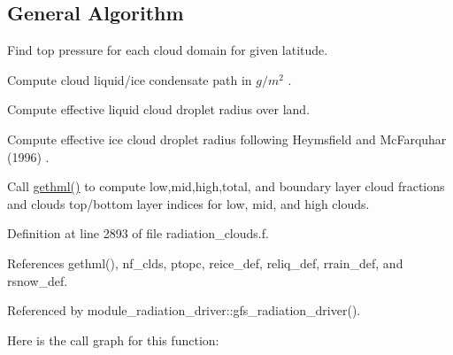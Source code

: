 \hypertarget{group__module__radiation__clouds_gen_progclduni}{}\subsection{General Algorithm}\label{group__module__radiation__clouds_gen_progclduni}

\begin{DoxyEnumerate}
\item Find top pressure for each cloud domain for given latitude.
\item Compute cloud liquid/ice condensate path in $ g/m^2 $ .
\item Compute effective liquid cloud droplet radius over land.
\item Compute effective ice cloud droplet radius following Heymsfield and Mc\+Farquhar (1996) \cite{heymsfield_and_mcfarquhar_1996}.
\item Call \hyperlink{group__module__radiation__clouds_gac231d967afcfb252dedba82e9085b34d}{gethml()} to compute low,mid,high,total, and boundary layer cloud fractions and clouds top/bottom layer indices for low, mid, and high clouds. 
\end{DoxyEnumerate}

Definition at line 2893 of file radiation\+\_\+clouds.\+f.



References gethml(), nf\+\_\+clds, ptopc, reice\+\_\+def, reliq\+\_\+def, rrain\+\_\+def, and rsnow\+\_\+def.



Referenced by module\+\_\+radiation\+\_\+driver\+::gfs\+\_\+radiation\+\_\+driver().

Here is the call graph for this function\+:
